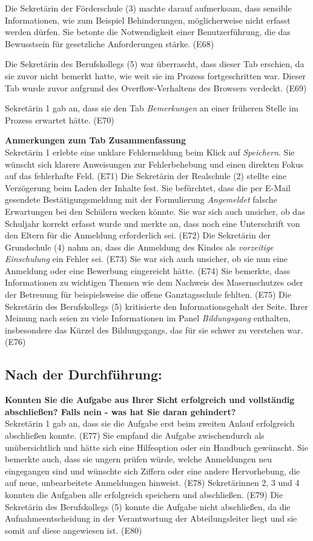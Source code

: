 Die Sekretärin der Förderschule (3) machte darauf aufmerksam, dass sensible Informationen, wie zum Beispiel Behinderungen, möglicherweise nicht erfasst werden dürfen. Sie betonte die Notwendigkeit einer Benutzerführung, die das Bewusstsein für gesetzliche Anforderungen stärke. (E68)

Die Sekretärin des Berufskollegs (5) war überrascht, dass dieser Tab erschien, da sie zuvor nicht bemerkt hatte, wie weit sie im Prozess fortgeschritten war. Dieser Tab wurde zuvor aufgrund des Overflow-Verhaltens des Browsers verdeckt. (E69)

Sekretärin 1 gab an, dass sie den Tab \textit{Bemerkungen} an einer früheren Stelle im Prozess erwartet hätte. (E70)

\textbf{Anmerkungen zum Tab \glqq Zusammenfassung\grqq{}}\\
Sekretärin 1 erlebte eine unklare Fehlermeldung beim Klick auf \textit{Speichern}. Sie wünscht sich klarere Anweisungen zur Fehlerbehebung und einen direkten Fokus auf das fehlerhafte Feld. (E71)
Die Sekretärin der Realschule (2) stellte eine Verzögerung beim Laden der Inhalte fest. Sie befürchtet, dass die per E-Mail gesendete Bestätigungsmeldung mit der Formulierung \textit{Angemeldet} falsche Erwartungen bei den Schülern wecken könnte. Sie war sich auch unsicher, ob das Schuljahr korrekt erfasst wurde und merkte an, dass noch eine Unterschrift von den Eltern für die Anmeldung erforderlich sei. (E72)
Die Sekretärin der Grundschule (4) nahm an, dass die Anmeldung des Kindes als \textit{vorzeitige Einschulung} ein Fehler sei. (E73) Sie war sich auch unsicher, ob sie nun eine \glqq Anmeldung\grqq{} oder eine \glqq Bewerbung\grqq{} eingereicht hätte. (E74) Sie bemerkte, dass Informationen zu wichtigen Themen wie dem Nachweis des Masernschutzes oder der Betreuung für beispielsweise die offene Ganztagsschule fehlten. (E75)
Die Sekretärin des Berufskollegs (5) kritisierte den Informationsgehalt der Seite. Ihrer Meinung nach seien zu viele Informationen im Panel \textit{Bildungsgang} enthalten, insbesondere das Kürzel des Bildungsgangs, das für sie schwer zu verstehen war. (E76)

\subsection{Nach der Durchführung:}

\textbf{Konnten Sie die Aufgabe aus Ihrer Sicht erfolgreich und vollständig abschließen? Falls nein - was hat Sie daran gehindert?}\\
Sekretärin 1 gab an, dass sie die Aufgabe erst beim zweiten Anlauf erfolgreich abschließen konnte. (E77) Sie empfand die Aufgabe zwischendurch als unübersichtlich und hätte sich eine Hilfeoption oder ein Handbuch gewünscht. Sie bemerkte auch, dass sie ungern prüfen würde, welche Anmeldungen neu eingegangen sind und wünschte sich Ziffern oder eine andere Hervorhebung, die auf neue, unbearbeitete Anmeldungen hinweist. (E78)
Sekretärinnen 2, 3 und 4 konnten die Aufgaben alle erfolgreich speichern und abschließen.  (E79)
Die Sekretärin des Berufskollegs (5) konnte die Aufgabe nicht abschließen, da die Aufnahmeentscheidung in der Verantwortung der Abteilungsleiter liegt und sie somit auf diese angewiesen ist. (E80)

